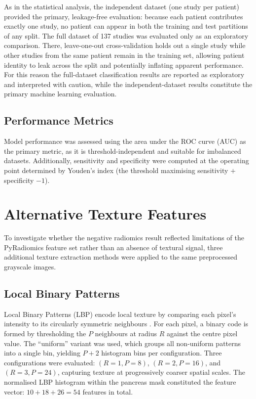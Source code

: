 As in the statistical analysis, the independent dataset (one study per patient) provided the primary, leakage-free evaluation: because each patient contributes exactly one study, no patient can appear in both the training and test partitions of any split. The full dataset of 137 studies was evaluated only as an exploratory comparison. There, leave-one-out cross-validation holds out a single study while other studies from the same patient remain in the training set, allowing patient identity to leak across the split and potentially inflating apparent performance. For this reason the full-dataset classification results are reported as exploratory and interpreted with caution, while the independent-dataset results constitute the primary machine learning evaluation.

\subsection{Performance Metrics}

Model performance was assessed using the area under the ROC curve (AUC) as the primary metric, as it is threshold-independent and suitable for imbalanced datasets. Additionally, sensitivity and specificity were computed at the operating point determined by Youden's index (the threshold maximising sensitivity $+$ specificity $- 1$).


\section{Alternative Texture Features}
\label{sec:alternative_features}

To investigate whether the negative radiomics result reflected limitations of the PyRadiomics feature set rather than an absence of textural signal, three additional texture extraction methods were applied to the same preprocessed grayscale images.

\subsection{Local Binary Patterns}

Local Binary Patterns (LBP) encode local texture by comparing each pixel's intensity to its circularly symmetric neighbours \cite{ojala2002}. For each pixel, a binary code is formed by thresholding the $P$ neighbours at radius $R$ against the centre pixel value. The ``uniform'' variant was used, which groups all non-uniform patterns into a single bin, yielding $P + 2$ histogram bins per configuration. Three configurations were evaluated: $(R = 1, P = 8)$, $(R = 2, P = 16)$, and $(R = 3, P = 24)$, capturing texture at progressively coarser spatial scales. The normalised LBP histogram within the pancreas mask constituted the feature vector: $10 + 18 + 26 = 54$ features in total.

